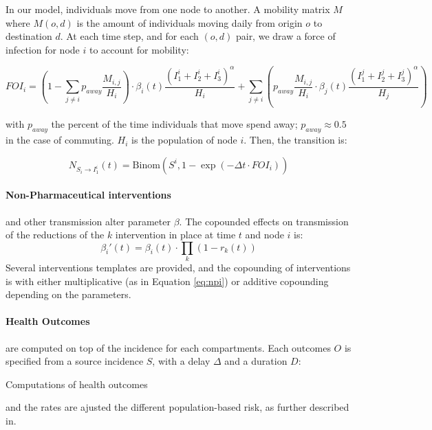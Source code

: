 In our model, individuals move from one node to another. A mobility matrix $M$ where
$M(o,d)$ is the amount of individuals moving daily from origin $o$ to
destination $d$. At each time step, and for each $(o,d)$ pair, we draw a force of infection 
for node $i$ to account for mobility:
\begin{fullwidth}
\begin{equation}
FOI_i = \left(1 - \sum_{j\neq i} p_{away} \frac{M_{i,j}}{H_i} \right) \cdot \beta_i(t) \frac{(I_1^{i} + I_2^{i} + I_3^{i})^\alpha}{H_i} +  \sum_{j \neq i} \left(p_{away} \frac{M_{i,j}}{H_i} \cdot \beta_j(t) \frac{(I_1^j + I_2^j + I_3^j)^\alpha}{H_j} \right)
\end{equation}
\end{fullwidth}

with $p_{away}$ the percent of the time individuals that move spend away; $p_{away} \approx 0.5$ in the case of commuting. $H_i$ is the population of node $i$. Then, the transition is:

\begin{equation}
N_{S_i \longrightarrow I_1^{i}}(t) = \text{Binom}(S^i, 1 - \exp(-\Delta t \cdot FOI_i))
\end{equation}

\paragraph{Non-Pharmaceutical interventions} and other transmission alter parameter $\beta$. The copounded effects on transmission of the reductions of the $k$ intervention in place at time $t$ and node $i$ is:
\begin{equation}
	\beta_i'(t) =  \beta_i(t) \cdot  \prod_k \left(1-r_k(t) \right) \label{eq:npi}%
\end{equation}
Several interventions templates are provided, and the copounding  of interventions is with either multiplicative (as in Equation \eqref{eq:npi}) or additive copounding depending on the parameters. 

\paragraph{Health Outcomes} are computed on top of the incidence for each compartments. Each outcomes $O$  is specified from a source incidence $S$, with a delay $\Delta$ and a duration $D$:

 \begin{algorithm}[H]
\SetAlgoLined
 \caption{Computations of health outcomes}
\end{algorithm}
and the rates are ajusted the different population-based risk, as further described in\cite{Lemaitre:ScenarioModelingPipeline:2021}.



